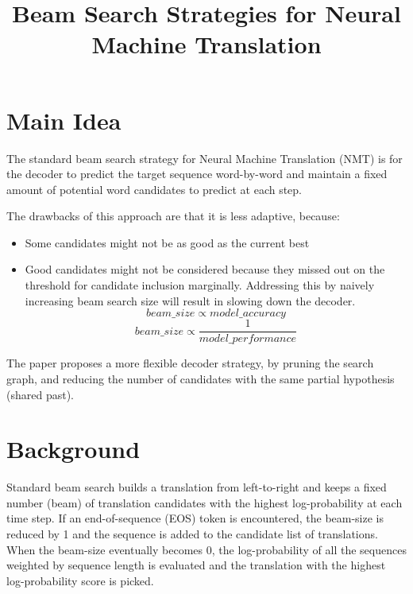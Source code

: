 \documentclass[12pt]{scrartcl}
\begin{document}
\title{Beam Search Strategies for Neural Machine Translation}
\author{}
\date{}
\maketitle

\section{Main Idea}
  The standard beam search strategy for Neural Machine Translation (NMT) is for the decoder to predict the target sequence word-by-word and maintain a fixed amount of potential word candidates to predict at each step. 
  
  The drawbacks of this approach are that it is less adaptive, because: 
  \begin{itemize}
    \item Some candidates might not be as good as the current best
    \item Good candidates might not be considered because they missed out on the threshold for candidate inclusion marginally. Addressing this by naively increasing beam search size will result in slowing down the decoder.
    $$beam\_size \propto model\_accuracy$$
    $$beam\_size \propto \frac{1}{model\_performance}$$
  \end{itemize}

  The paper proposes a more flexible decoder strategy, by pruning the search graph, and reducing the number of candidates with the same partial hypothesis (shared past). \cite{freitag2017beam}

\section{Background}
  Standard beam search builds a translation from left-to-right and keeps a fixed
  number (beam) of translation candidates with the highest log-probability at each time step. If an end-of-sequence (EOS) token is encountered, the beam-size is reduced by 1 and the sequence is added to the candidate list of translations. When the beam-size eventually becomes 0, the log-probability of all the sequences weighted by sequence length is evaluated and the translation with the highest log-probability score is picked.
\end{document}
